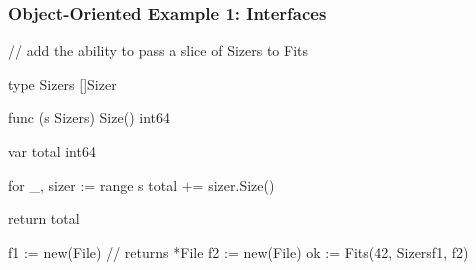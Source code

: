 \documentclass[handout,compress,t,11pt]{beamer}
\begin{document}
\begin{frame}[fragile]
    \frametitle{Object-Oriented Example 1: Interfaces}
\begin{golang}
// add the ability to pass a slice of Sizers to Fits

type Sizers []Sizer

func (s Sizers) Size() int64 {
    var total int64

    for _, sizer := range s {
        total += sizer.Size()
    }

    return total
}

f1 := new(File) // returns *File
f2 := new(File)
ok := Fits(42, Sizers{f1, f2})
\end{golang}
\end{frame}

%
%
%
%
%
%
%

%
%
%
%
\end{document}
